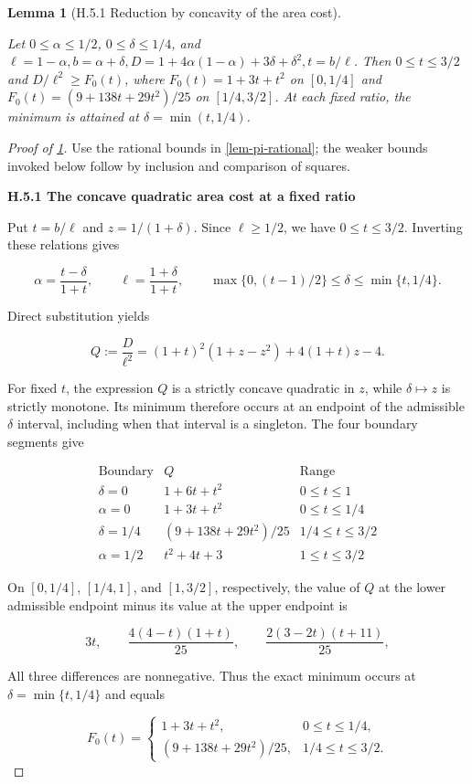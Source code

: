 \documentclass[11pt,a4paper]{article}
\theoremstyle{proofmanuscript}
\newtheorem{lemma}[theorem]{Lemma}
\begin{document}
\begin{lemma}[H.5.1 Reduction by concavity of the area cost]\label{lem-high-cost-reduction}

Let \(0\le\alpha\le1/2\), \(0\le\delta\le1/4\), and \(\ell=1-\alpha,b=\alpha+\delta,D=1+4\alpha(1-\alpha)+3\delta+\delta^2,t=b/\ell\). Then \(0\le t\le3/2\) and \(D/\ell^2\ge F_0(t)\), where \(F_0(t)=1+3t+t^2\) on \([0,1/4]\) and \(F_0(t)=(9+138t+29t^2)/25\) on \([1/4,3/2]\). At each fixed ratio, the minimum is attained at \(\delta=\min(t,1/4)\).

\end{lemma}

\begin{proof}[Proof of \ref{lem-high-cost-reduction}]

Use the rational bounds in \ref{lem-pi-rational}; the weaker bounds invoked below follow by inclusion and comparison of squares.

\textbf{H.5.1 The concave quadratic area cost at a fixed ratio}

Put \(t=b/\ell\) and \(z=1/(1+\delta)\). Since \(\ell\ge1/2\), we have \(0\le t\le3/2\). Inverting these relations gives

\[
\alpha=\frac{t-\delta}{1+t},\qquad
\ell=\frac{1+\delta}{1+t},\qquad
\max\{0,(t-1)/2\}\le\delta\le\min\{t,1/4\}.
\]

Direct substitution yields

\[
Q:=\frac D{\ell^2}
=(1+t)^2(1+z-z^2)+4(1+t)z-4.
\tag{H.5.2}
\]

For fixed \(t\), the expression \(Q\) is a strictly concave quadratic in \(z\), while \(\delta\mapsto z\) is strictly monotone. Its minimum therefore occurs at an endpoint of the admissible \(\delta\) interval, including when that interval is a singleton. The four boundary segments give

\[
\begin{array}{c|c|c}
\text{Boundary}&Q&\text{Range}\\\hline
\delta=0&1+6t+t^2&0\le t\le1\\
\alpha=0&1+3t+t^2&0\le t\le1/4\\
\delta=1/4&(9+138t+29t^2)/25&1/4\le t\le3/2\\
\alpha=1/2&t^2+4t+3&1\le t\le3/2
\end{array}
\]

On \([0,1/4]\), \([1/4,1]\), and \([1,3/2]\), respectively, the value of \(Q\) at the lower admissible endpoint minus its value at the upper endpoint is

\[
3t,\qquad \frac{4(4-t)(1+t)}{25},\qquad
\frac{2(3-2t)(t+11)}{25},
\]

All three differences are nonnegative. Thus the exact minimum occurs at \(\delta=\min\{t,1/4\}\) and equals

\[
F_0(t)=\begin{cases}
1+3t+t^2,&0\le t\le1/4,\\
(9+138t+29t^2)/25,&1/4\le t\le3/2.
\end{cases}
\tag{H.5.3}
\]

\end{proof}
\end{document}
